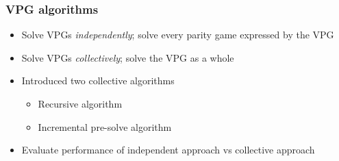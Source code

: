 \documentclass[aspectratio=169]{beamer}
\begin{document}
\begin{frame}[t]
\frametitle{VPG algorithms}
	\begin{itemize}
		\item Solve VPGs \textit{independently}; solve every parity game expressed by the VPG
		\item Solve VPGs \textit{collectively}; solve the VPG as a whole\pause
		\item Introduced two collective algorithms
		\begin{itemize}
			\item Recursive algorithm
			\item Incremental pre-solve algorithm
		\end{itemize}
		\item Evaluate performance of independent approach vs collective approach
	\end{itemize}
\end{frame}
\end{document}
